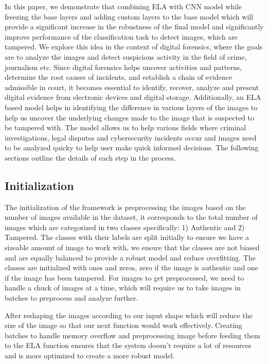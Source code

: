 \documentclass{ieeeaccess}
\begin{document}
In this paper, we demonstrate that combining ELA with CNN model while freezing the base layers and adding custom layers to the base model which will provide a significant increase in the robustness of the final model and significantly improve performance of the classification task to detect images, which are tampered. We explore this idea in the context of digital forensics, where the goals are to analyze the images and detect suspicious activity in the field of crime, journalism etc. Since digital forensics helps uncover activities and patterns, determine the root causes of incidents, and establish a chain of evidence admissible in court, it becomes essential to identify, recover, analyze and present digital evidence from electronic devices and digital storage. Additionally, an ELA based model helps in identifying the difference in various layers of the images to help us uncover the underlying changes made to the image that is suspected to be tampered with. The model allows us to help various fields where criminal investigations, legal disputes and cybersecurity incidents occur and images need to be analyzed quicky to help user make quick informed decisions. The following sections outline the details of each step in the process.

\subsection{Initialization}

The initialization of the framework is preprocessing the images based on the number of images available in the dataset, it corresponds to the total number of images which are categorized in two classes specifically: 1) Authentic and 2) Tampered. The classes with their labels are split initially to ensure we have a sizeable amount of image to work with, we ensure that the classes are not biased and are equally balanced to provide a robust model and reduce overfitting. The classes are initialized with ones and zeros, zero if the image is authentic and one if the image has been tampered. For images to get preprocessed, we need to handle a chuck of images at a time, which will require us to take images in batches to preprocess and analyze further. 

After reshaping the images according to our input shape which will reduce the size of the image so that our next function would work effectively. Creating batches to handle memory overflow and preprocessing image before feeding them to the ELA function ensures that the system doesn’t require a lot of resources and is more optimized to create a more robust model.
\end{document}
